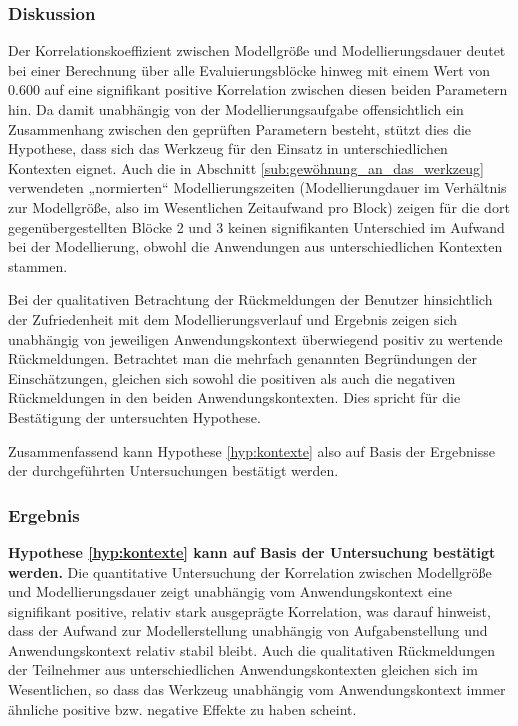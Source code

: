 \subsubsection{Diskussion} 

Der Korrelationskoeffizient zwischen Modellgröße und Modellierungsdauer deutet bei einer Berechnung über alle Evaluierungsblöcke hinweg mit einem Wert von $0.600$ auf eine signifikant positive Korrelation zwischen diesen beiden Parametern hin. Da damit unabhängig von der Modellierungsaufgabe offensichtlich ein Zusammenhang zwischen den geprüften Parametern besteht, stützt dies die Hypothese, dass sich das Werkzeug für den Einsatz in unterschiedlichen Kontexten eignet. Auch die in Abschnitt \ref{sub:gewöhnung_an_das_werkzeug} verwendeten „normierten“ Modellierungszeiten (Modellierungdauer im Verhältnis zur Modellgröße, also im Wesentlichen Zeitaufwand pro Block) zeigen für die dort gegenübergestellten Blöcke 2 und 3 keinen signifikanten Unterschied im Aufwand bei der Modellierung, obwohl die Anwendungen aus unterschiedlichen Kontexten stammen.

Bei der qualitativen Betrachtung der Rückmeldungen der Benutzer hinsichtlich der Zufriedenheit mit dem Modellierungsverlauf und Ergebnis zeigen sich unabhängig von jeweiligen Anwendungskontext überwiegend positiv zu wertende Rückmeldungen. Betrachtet man die mehrfach genannten Begründungen der Einschätzungen, gleichen sich sowohl die positiven als auch die negativen Rückmeldungen in den beiden Anwendungskontexten. Dies spricht für die Bestätigung der untersuchten Hypothese.

Zusammenfassend kann Hypothese \ref{hyp:kontexte} also auf Basis der Ergebnisse der durchgeführten Untersuchungen bestätigt werden.

\subsubsection{Ergebnis} 

\textbf{Hypothese \ref{hyp:kontexte} kann auf Basis der Untersuchung bestätigt werden.} Die quantitative Untersuchung der Korrelation zwischen Modellgröße und Modellierungsdauer zeigt unabhängig vom Anwendungskontext eine signifikant positive, relativ stark ausgeprägte Korrelation, was darauf hinweist, dass der Aufwand zur Modellerstellung unabhängig von Aufgabenstellung und Anwendungskontext relativ stabil bleibt. Auch die qualitativen Rückmeldungen der Teilnehmer aus unterschiedlichen Anwendungskontexten gleichen sich im Wesentlichen, so dass das Werkzeug unabhängig vom Anwendungskontext immer ähnliche positive bzw. negative Effekte zu haben scheint.

